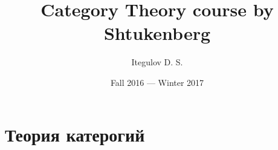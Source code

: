 \documentclass[a4paper, fleqn, draft]{report}
\author{Itegulov D. S.}
\title{Category Theory course by Shtukenberg}
\date{Fall 2016 --- Winter 2017}
\begin{document}
\maketitle
\tableofcontents
\newpage
\chapter{Теория катерогий}


\end{document}

